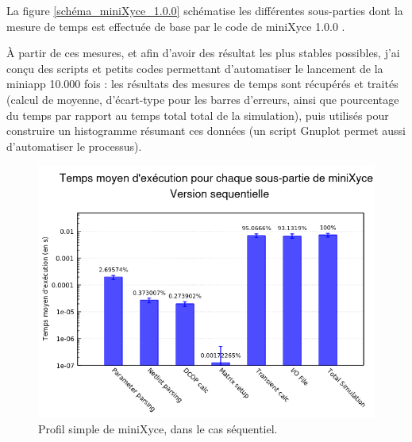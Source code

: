 \documentclass[11pt,a4paper,oneside]{memoir}
\theoremstyle{definition}
\theoremstyle{remark}
\theoremstyle{plain}
\begin{document}
La figure \ref{schéma_miniXyce_1.0.0} schématise les différentes sous-parties dont la mesure de temps est effectuée de base par le code de miniXyce 1.0.0 .\bigskip

\`A partir de ces mesures, et afin d'avoir des résultat les plus stables possibles, j'ai conçu des scripts et petits codes permettant d'automatiser le lancement de la miniapp 10.000 fois : les résultats des mesures de temps sont récupérés et traités (calcul de moyenne, d'écart-type pour les barres d'erreurs, ainsi que pourcentage du temps par rapport au temps total total de la simulation), puis utilisés pour construire un histogramme résumant ces données (un script Gnuplot permet aussi d'automatiser le processus).\bigskip

\begin{figure}
\begin{center}
\includegraphics[scale=0.6]{Images-Rapport/Profil_miniXyce/Profil_miniXyce_sequentiel.png}
\caption{Profil simple de miniXyce, dans le cas séquentiel.}
\label{Profil_miniXyce_sequentiel}
\end{center}
\end{figure}
\end{document}
